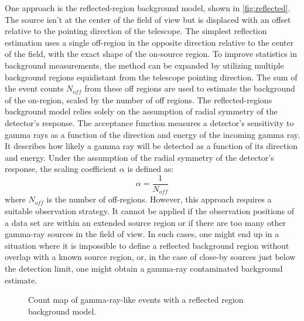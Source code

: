 One approach is the reflected-region background model, shown in \autoref{fig:reflected}. The source isn't at the center of the field of view but is displaced with an offset relative to the pointing direction of the telescope. The simplest reflection estimation uses a single off-region in the opposite direction relative to the center of the field, with the exact shape of the on-source region. To improve statistics in background measurements, the method can be expanded by utilizing multiple background regions equidistant from the telescope pointing direction. The sum of the event counts $N_{off}$ from these off regions are used to estimate the background of the on-region, scaled by the number of off regions. 
The reflected-regions background model relies solely on the assumption of radial symmetry of the detector's response. The acceptance function measures a detector's sensitivity to gamma rays as a function of the direction and energy of the incoming gamma ray. It describes how likely a gamma ray will be detected as a function of its direction and energy. Under the assumption of the radial symmetry of the detector's response, the scaling coefficient $\alpha$ is defined as:  
$$
\alpha=\frac{1}{N_{off}}
$$
where $N_{off}$ is the number of off-regions.
However, this approach requires a suitable observation strategy. It cannot be applied if the observation positions of a data set are within an extended source region or if there are too many other gamma-ray sources in the field of view. In such cases, one might end up in a situation where it is impossible to define a reflected background region without overlap with a known source region, or, in the case of close-by sources just below the detection limit, one might obtain a gamma-ray contaminated background estimate.
 \begin{figure}[t]
\centering

\caption{Count map of gamma-ray-like events with a reflected region background model.}
\label{fig:reflected}
\end{figure}



